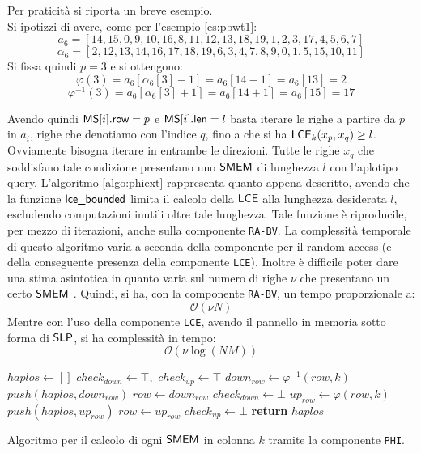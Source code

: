 \begin{esempio}
  Per praticità si riporta un breve esempio.\\
  Si ipotizzi di avere, come per l'esempio \ref{es:pbwt1}:
  \[a_6=[14,15,0,9,10,16,8,11,12,13,18,19,1,2,3,17,4,5,6,7]\]
  \[\alpha_6=[2,12,13,14,16,17,18,19,6,3,4,7,8,9,0,1,5,15,10,11]\]
  Si fissa quindi $p=3$ e si ottengono:
  \[\varphi(3)=a_6[\alpha_6[3]-1]=a_6[14-1]=a_6[13]=2\]
  \[\varphi^{-1}(3)=a_6[\alpha_6[3]+1]=a_6[14+1]=a_6[15]=17\]
\end{esempio}
Avendo quindi $\mbox{\rm {\sf MS}}[i].\mbox{\rm {\sf row}}=p$ e $\mbox{\rm {\sf MS}}[i].\mbox{\rm {\sf len}}=l$ basta iterare le righe a partire
da 
$p$ in $a_i$, righe che denotiamo con l'indice $q$, fino a che si ha 
$\mbox{\rm {\sf LCE}}_k(x_p, x_q)\geq l$. Ovviamente bisogna iterare in entrambe le
direzioni. Tutte le righe $x_q$ che soddisfano tale condizione presentano uno
$\mbox{\rm {\sf SMEM}}$ di lunghezza $l$ con 
l'aplotipo query. L'algoritmo \ref{algo:phiext} rappresenta quanto
appena descritto, avendo che la funzione $\mbox{\rm {\sf lce\_bounded}}$ limita il calcolo
della 
$\mbox{\rm {\sf LCE}}$ alla lunghezza desiderata $l$, escludendo computazioni inutili oltre tale
lunghezza. Tale funzione è riproducile, per mezzo di iterazioni, anche sulla
componente \texttt{RA-BV}. La complessità temporale di questo algoritmo
varia a seconda della componente per il random access (e della conseguente
presenza della 
componente \texttt{LCE}). Inoltre è difficile poter dare una stima asintotica in
quanto varia sul numero di righe $\nu$ che presentano un certo $\mbox{\rm {\sf SMEM}}$ . Quindi, si ha, con la
componente \texttt{RA-BV}, un tempo proporzionale a:
\begin{equation}
  \label{eq:phiaccbv}
  \mathcal{O}(\nu N)
\end{equation}
Mentre con l'uso della componente \texttt{LCE}, avendo il pannello in memoria
sotto forma di $\mbox{\rm {\sf SLP}}$, si ha complessità in tempo:
\begin{equation}
  \label{eq:phiaccbv2}
  \mathcal{O}(\nu\log (NM))
\end{equation}
\begin{algorithm}
  \small
  \begin{algorithmic}[1]
    \State $haplos\gets []$
    \State $check_{down}\gets \top,\,\,check_{up}\gets \top$
    \State $down_{row}\gets \varphi^{-1}(row, k)$
    \State $push(haplos, down_{row})$
    \State $row \gets down_{row}$
    \Else
    \State $check_{down}\gets \bot$
    \EndIf
    \EndWhile
    \State $up_{row}\gets \varphi(row, k)$
    \State $push(haplos, up_{row})$
    \State $row \gets up_{row}$
    \Else
    \State $check_{up}\gets \bot$
    \EndIf
    \EndWhile
    \State \textbf{return} $haplos$
    \EndFunction
  \end{algorithmic}
  \caption{\footnotesize{Algoritmo per il calcolo di ogni $\mbox{\rm {\sf SMEM}}$ in colonna $k$
  tramite la 
  componente \texttt{PHI}.}}
  \label{algo:phiext}
\end{algorithm}

